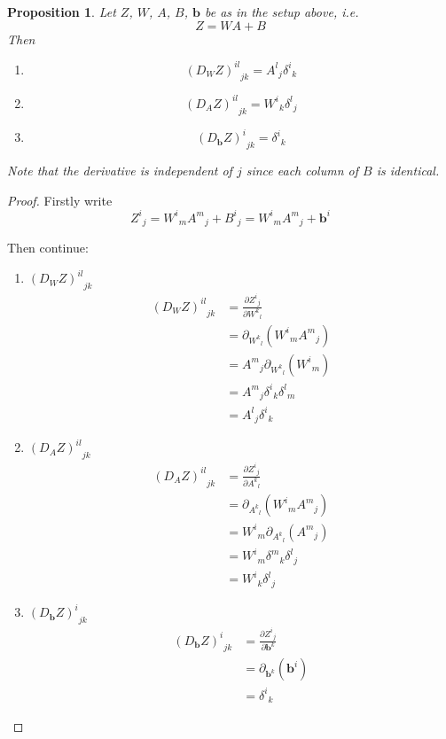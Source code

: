 \documentclass[a4paper]{article}
\theoremstyle{plain} %
\newtheorem{proposition}[theorem]{Proposition}
\theoremstyle{definition} %
\numberwithin{equation}{subsection}
\newcommand{\del}[2]{\frac{\partial #1}{\partial #2}}
\newcommand{\vb}{{\textbf{b}}}
\begin{document}
\begin{proposition} \label{prop:nn-tensor-DZ}
  Let $Z$, $W$, $A$, $B$, $\vb$ be as in the setup above, i.e.
  \[ Z = WA + B \]
  Then
  \begin{enumerate}
    \item \[ {(D_WZ)^{il}}_{jk} = {A^l}_j {\delta^i}_k\]
    \item \[ {(D_AZ)^{il}}_{jk} = {W^i}_k {\delta^l}_j\]
    \item \[ {(D_{\vb}Z)^{i}}_{jk} = {\delta^i}_k\]
  \end{enumerate}
  Note that the derivative is independent of $j$ since each column of $B$ is identical.
\end{proposition}
\begin{proof}

  Firstly write 
  \[ {Z^i}_j = {W^i}_m{A^m}_j + {B^i}_j = {W^i}_m{A^m}_j + \vb^i\]

  Then continue:

  \begin{enumerate}
    \item ${(D_WZ)^{il}}_{jk}$
    \begin{align*}
      {(D_WZ)^{il}}_{jk} &= \del{{Z^i}_j}{{W^k}_l} \\
       &= \partial_{{W^k}_l}({W^i}_m{A^m}_j) \\
       &= {A^m}_j\partial_{{W^k}_l}({W^i}_m) \\
       &= {A^m}_j {\delta^i}_k{\delta^l}_m \\
       &= {A^l}_j {\delta^i}_k
    \end{align*}
    \item ${(D_AZ)^{il}}_{jk} $
    \begin{align*}
      {(D_AZ)^{il}}_{jk} &= \del{{Z^i}_j}{{A^k}_l} \\
       &= \partial_{{A^k}_l}({W^i}_m{A^m}_j) \\
       &= {W^i}_m\partial_{{A^k}_l}({A^m}_j) \\
       &= {W^i}_m {\delta^m}_k{\delta^l}_j \\
       &= {W^i}_k {\delta^l}_j
    \end{align*}
    \item ${(D_\vb Z)^{i}}_{jk}$
    \begin{align*}
      {(D_{\vb} Z)^{i}}_{jk} &= \del{{Z^i}_j}{\vb^k} \\
       &= \partial_{{\vb^k}}(\vb^i) \\
       &= {\delta^i}_k
    \end{align*}
  \end{enumerate}
\end{proof}
\end{document}
